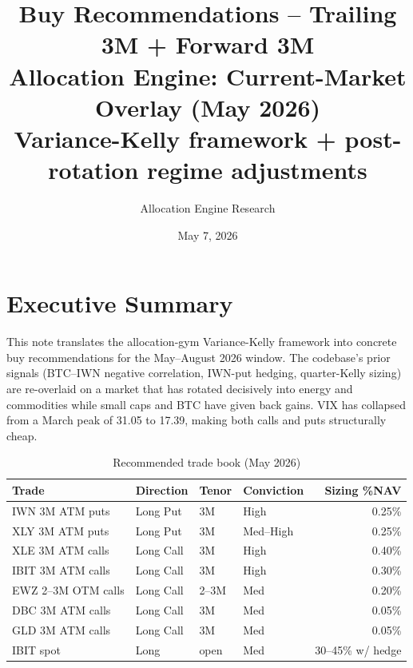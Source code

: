 \documentclass[11pt,letterpaper]{article}
\title{%
  \textbf{Buy Recommendations} -- Trailing 3M + Forward 3M \\[4pt]
  \large Allocation Engine: Current-Market Overlay (May 2026) \\[2pt]
  \normalsize Variance-Kelly framework + post-rotation regime adjustments
}
\author{Allocation Engine Research}
\date{May 7, 2026}
\begin{document}
\maketitle
\thispagestyle{fancy}

\section{Executive Summary}

This note translates the allocation-gym Variance-Kelly framework into
concrete buy recommendations for the May--August 2026 window. The
codebase's prior signals (BTC--IWN negative correlation, IWN-put
hedging, quarter-Kelly sizing) are re-overlaid on a market that has
rotated decisively into energy and commodities while small caps and
BTC have given back gains. VIX has collapsed from a March peak of
31.05 to 17.39, making both calls and puts structurally cheap.

\begin{table}[H]
\centering
\caption{Recommended trade book (May 2026)}
\begin{tabular}{l l l l r}
\toprule
Trade & Direction & Tenor & Conviction & Sizing \%NAV \\
\midrule
IWN 3M ATM puts        & \textcolor{loss}{Long Put}  & 3M     & High      & 0.25\% \\
XLY 3M ATM puts        & \textcolor{loss}{Long Put}  & 3M     & Med--High & 0.25\% \\
XLE 3M ATM calls       & \textcolor{gain}{Long Call} & 3M     & High      & 0.40\% \\
IBIT 3M ATM calls      & \textcolor{gain}{Long Call} & 3M     & High      & 0.30\% \\
EWZ 2--3M OTM calls    & \textcolor{gain}{Long Call} & 2--3M  & Med       & 0.20\% \\
DBC 3M ATM calls       & \textcolor{gain}{Long Call} & 3M     & Med       & 0.05\% \\
GLD 3M ATM calls       & \textcolor{gain}{Long Call} & 3M     & Med       & 0.05\% \\
IBIT spot              & \textcolor{neutral}{Long}   & open   & Med       & 30--45\% w/ hedge \\
\bottomrule
\end{tabular}
\end{table}

\end{document}
